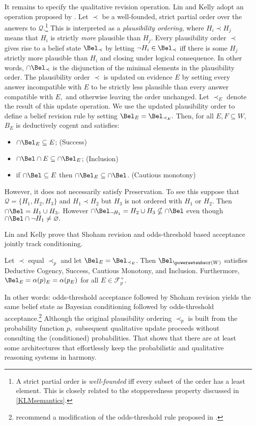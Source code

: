It remains to specify the qualitative revision operation. Lin and Kelly adopt an
operation proposed by \citet{shoham1987semantical}. Let $\prec$ be a
well-founded, strict partial order over the answers to $\mathcal{Q}$.\footnote{A
strict partial order is {\em well-founded} iff every subset of the order has a
least element. This is closely related to the stopperedness property discussed
in \autoref{KLMsemantics}.} This is interpreted as a {\em plausibility
ordering,} where $H_i \prec H_j$ means that $H_i$ is strictly {\em more}
plausible than $H_j$. Every plausibility order $\prec$ gives rise to a belief
state $\Bel_\prec$ by letting $\neg H_i\in \Bel_\prec$ iff there is some $H_j$
strictly more plausible than $H_i$ and closing under logical consequence. In
other words, $\cap \Bel_\prec$ is the disjunction of the minimal elements in the
plausibility order. The plausibility order $\prec$ is updated on evidence $E$ by
setting every answer incompatible with $E$ to be strictly less plausible than
every answer compatible with $E,$ and otherwise leaving the order unchanged. Let
$\prec_E$ denote the result of this update operation. We use the updated
plausibility order to define a belief revision rule by setting $\Bel_E =
\Bel_{\prec_E}.$ Then, for all $E,F\subseteq W$, $B_E$ is deductively cogent and
satisfies:
\begin{itemize}
\item[] $\cap \Bel_E\subseteq E$; \hfill(Success)
\item[] $\cap \Bel \cap E \subseteq \cap\Bel_E$; \hfill(Inclusion)
\item[] if $\cap\Bel\subseteq E$ then $\cap \Bel_E \subseteq \cap \Bel$.
\hfill(Cautious monotony)
\end{itemize}
However, it does not necessarily satisfy Preservation. To see this suppose that
$\mathcal{Q}=\{H_1, H_2, H_3\}$ and $H_1 \prec H_2$ but $H_3$ is not ordered
with $H_1$ or $H_2$. Then $\cap \Bel = H_1\cup H_3.$ However $\cap\Bel_{\neg
H_1} = H_2 \cup H_3\nsubseteq \cap \Bel$ even though $\cap \Bel \cap \neg H_1
\neq \varnothing.$

Lin and Kelly prove that Shoham revision and odds-threshold based acceptance
jointly track conditioning.
\begin{theorem}
Let $\prec$  equal $\prec_p$ and let $\Bel_E = \Bel_{\prec_E}$. Then
$\Bel_{\powersetsubscr(W)}$ satisfies Deductive Cogency, Success, Cautious
Monotony, and Inclusion. Furthermore, $\Bel_E = \alpha(p)_E = \alpha(p_E)$ for
all $E\in\mathcal{F}_p^+$.
\end{theorem}
In other words: odds-threshold acceptance followed by Shoham revision yields the
same belief state as Bayesian conditioning followed by odds-threshold
acceptance.\footnote{\citet{lin2019correspondence} recommend a modification of
the odds-threshold rule proposed in  \citet{lin2012propositional}. }  Although
the original plausibility ordering $\prec_p$ is built from the probability
function $p,$ subsequent qualitative update proceeds without consulting the
(conditioned) probabilities. That shows that there are at least some
architectures that effortlessly keep the probabilistic and qualitative reasoning
systems in harmony.

